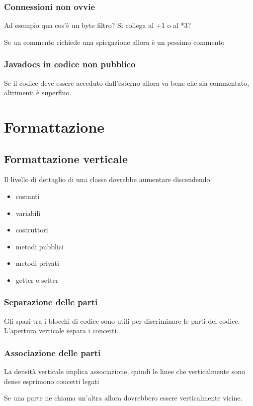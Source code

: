 \documentclass[11pt,a4paper]{book}
\begin{document}
\subsection{Connessioni non ovvie}
\label{code: 037}
Ad esempio qua cos'è un byte filtro? Si collega al +1 o al *3?

Se un commento richiede una spiegazione allora è un pessimo commento

\subsection{Javadocs in codice non pubblico}
Se il codice deve essere acceduto dall'esterno allora va bene che sia commentato, altrimenti è superfluo.

\chapter{Formattazione}
\section{Formattazione verticale} \label{par: formattazioneVerticale}
Il livello di dettaglio di una classe dovrebbe aumentare discendendo.
\begin{itemize}
	\item costanti
	\item variabili
	\item costruttori
	\item metodi pubblici
	\item metodi privati
	\item getter e setter
\end{itemize}

\subsection{Separazione delle parti}
Gli spazi tra i blocchi di codice sono utili per discriminare le parti del codice. L'apertura verticale separa i concetti.

\subsection{Associazione delle parti}
La densità verticale implica associazione, quindi le linee che verticalmente sono dense esprimono concetti legati

Se una parte ne chiama un'altra allora dovrebbero essere verticalmente vicine.
\end{document}
